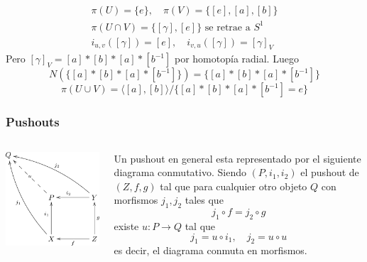 \documentclass[xetex,mathserif,serif]{beamer}
\begin{document}
\begin{frame}
\begin{center}
    \end{center}
    \pause
    \begin{gather*}
      \pi (U) = \{e\}, \quad \pi (V) = \{[e], [a], [b]\} \\
      \pi (U \cap V) = \{[\gamma], [e]\} \text{ se retrae a } S^1 \\
      i_{u,v} ([\gamma]) = [e], \quad i_{v,u} ([\gamma]) = [\gamma]_V
    \end{gather*}
    Pero \([\gamma]_{V} = [a]*[b]*[a]*[b^{-1}] \) por homotopía
    radial. Luego
    \[ N \left( \{[a]*[b]*[a]*[b^{-1}]\} \right) = \{[a]*[b]*[a]*[b^{-1}]\} \]
    \[ \pi (U \cup V) = \langle [a], [b] \rangle /
      \{[a]*[b]*[a]*[b^{-1}] = e\}\]
  \end{frame}

  \begin{frame}
    \frametitle{Pushouts}
    \begin{columns}
      \begin{column}{0.35\textwidth}
        \begin{flushleft}
          \includegraphics[scale=0.9]{../tesis/imagenes/pushout.png}
        \end{flushleft}
      \end{column}
      \begin{column}{0.65\textwidth}
        Un pushout en general esta representado por el siguiente
        diagrama conmutativo.
        Siendo \((P, i_1, i_2)\) el pushout de \((Z, f, g) \) tal que
        para cualquier otro objeto \(Q\) con morfismos \(j_1, j_2\)
        tales que \[ j_1 \circ f = j_2 \circ g \]
        existe \(u : P \to Q\) tal que
        \[ j_1 = u \circ i_1,\quad j_2 = u \circ u \]
        es decir, el diagrama conmuta en morfismos.
      \end{column}
    \end{columns}
  \end{frame}
\end{document}
